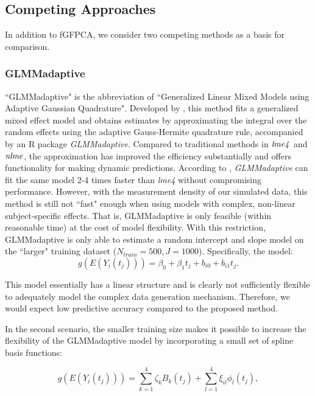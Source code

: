 \documentclass[12pt]{article}
\begin{document}
\subsection{Competing Approaches}
\label{subsec:compete_methods}

In addition to fGFPCA, we consider two competing methods as a basis for comparison.

\subsubsection{GLMMadaptive}
\label{subsubsec:adglmm}

``GLMMadaptive" is the abbreviation of ``Generalized Linear Mixed Models using Adaptive Gaussian Quadrature". Developed by \citet{Rizopoulos2017}, this method fits a generalized mixed effect model and obtains estimates by approximating the integral over the random effects using the adaptive Gauss-Hermite quadrature rule, accompanied by an R package \textit{GLMMadaptive}. Compared to traditional methods in $\it{lme4}$ and $\it{nlme}$, the approximation has improved the efficiency substantially and offers functionality for making dynamic predictions. According to \citet{Stringer2023}, \textit{GLMMadaptive} can fit the same model 2-4 times faster than \textit{lme4} without compromising performance. However, with the measurement density of our simulated data, this method is still not ``fast" enough when using models with complex, non-linear subject-specific effects. That is, GLMMadaptive is only feasible (within reasonable time) at the cost of model flexibility. With this restriction, GLMMadaptive is only able to estimate a random intercept and slope model on the ``larger" training dataset ($N_{train}=500, J=1000$). Specifically, the model:
\begin{equation}
g(E(Y_i(t_j))) = \beta_0+\beta_1t_j+b_{i0}+b_{i1}t_j.   
    \label{eq:glmm_linear}
\end{equation}

This model essentially has a linear structure and is clearly not sufficiently flexible to adequately model the complex data generation mechanism. Therefore, we would expect low predictive accuracy compared to the proposed method.

In the second scenario, the smaller training size makes it possible to increase the flexibility of the GLMMadaptive model by incorporating a small set of spline basis functions: 

\begin{equation}
    g(E(Y_i(t_j))) = \sum_{k=1}^4\zeta_{k}B_k(t_j)+\sum_{l=1}^4\xi_{il}\phi_l(t_j),
    \label{eq:glmm_sp}
\end{equation}
\end{document}
